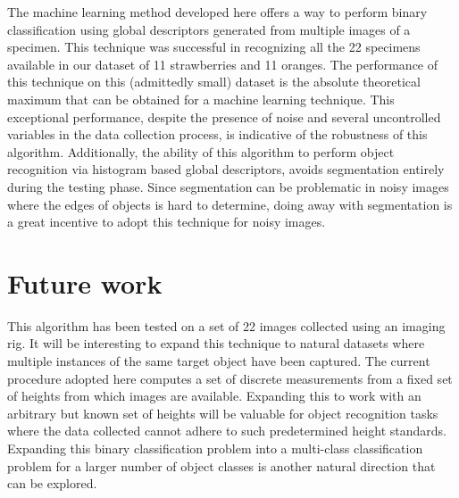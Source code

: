 The machine learning method developed here offers a way to perform binary classification using global descriptors generated from multiple images of a specimen. This technique was successful in recognizing all the 22 specimens available in our dataset of 11 strawberries and 11 oranges. The performance of this technique on this (admittedly small) dataset is the absolute theoretical maximum that can be obtained for a machine learning technique. This exceptional performance, despite the presence of noise and several uncontrolled variables in the data collection process, is indicative of the robustness of this algorithm. Additionally, the ability of this algorithm to perform object recognition via histogram based global descriptors, avoids segmentation entirely during the testing phase. Since segmentation can be problematic in noisy images where the edges of objects is hard to determine, doing away with segmentation is a great incentive to adopt this technique for noisy images.
\section{Future work}

This algorithm has been tested on a set of 22 images collected using an imaging rig. It will be interesting to expand this technique to natural datasets where multiple instances of the same target object have been captured. The current procedure adopted here computes a set of discrete measurements from a fixed set of heights from which images are available. Expanding this to work with an arbitrary but known set of heights will be valuable for object recognition tasks where the data collected cannot adhere to such predetermined height standards. Expanding this binary classification problem into a multi-class classification problem for a larger number of object classes is another natural direction that can be explored.



